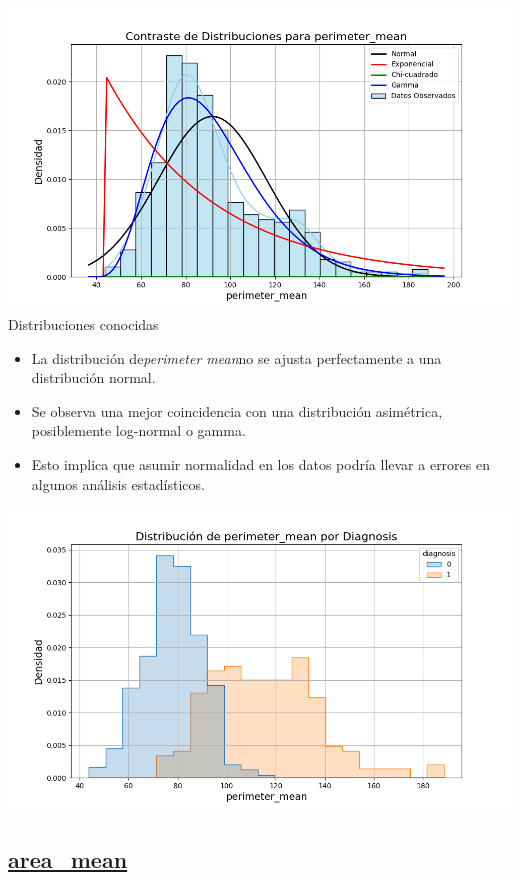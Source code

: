 \documentclass[a4paper, 12pt]{article}
\begin{document}
\includegraphics[width=\textwidth]{../Plots/plots_stats/perimeter_mean/distribuciones_conocidas_perimeter_mean.png}
Distribuciones conocidas

\begin{itemize}
\item La distribución de\textit{perimeter mean}no se ajusta perfectamente a una distribución normal.
\item Se observa una mejor coincidencia con una distribución asimétrica, posiblemente log-normal o gamma.
\item Esto implica que asumir normalidad en los datos podría llevar a errores en algunos análisis estadísticos.
\end{itemize}


\includegraphics[width=\textwidth]{../Plots/plots_diagnosis/distribucion_perimeter_mean_por_diagnosis.png}


\subsection*{\underline{area\_mean}}
\end{document}
